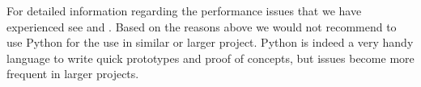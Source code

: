 For detailed information regarding the performance issues that we have experienced see \cite{slowpy} and \cite{slowpy2}. Based on the reasons above we would not recommend to use Python for the use in similar or larger project. Python is indeed a very handy language to write quick prototypes and proof of concepts, but issues become more frequent in larger projects.
